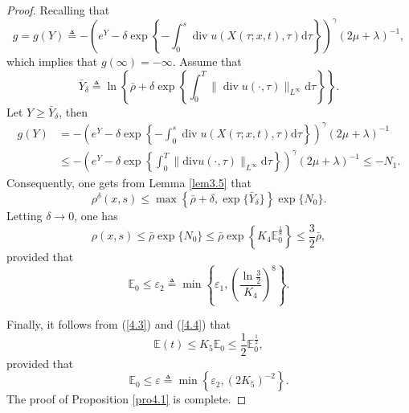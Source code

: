 \documentclass[10pt,a4paper]{amsart}
\DeclareMathOperator{\divv}{div}
\begin{document}
\begin{proof}
Recalling that
$$
g = g (Y) \triangleq - \left(e^{Y} - \delta \exp\left\{- \int^s_0 \divv u \left(X(\tau;x,t), \tau \right) \mathrm{d} \tau \right\} \right)^{\gamma} \left( 2 \mu + \lambda \right)^{-1},
$$
which implies that $g(\infty ) = - \infty $. Assume that
$$
\bar{Y}_{\delta} \triangleq \ln \left\{ \bar{\rho} + \delta \exp\left\{\int^T_0 \|\divv u(\cdot,\tau)\|_{L^{\infty }} \mathrm{d} \tau \right\} \right\}.
$$
Let $Y \geq \bar{Y}_{\delta}$, then
$$
\begin{aligned}
g(Y)
& = - \left(e^{Y} - \delta \exp\left\{- \int^s_0 \divv u \left(X(\tau;x,t), \tau \right) \mathrm{d} \tau \right\} \right)^{\gamma} \left( 2 \mu + \lambda \right)^{-1}\\
& \leq - \left(e^{Y} - \delta \exp\left\{\int^T_0 \|\mathrm{div} u (\cdot,\tau)\|_{L^{\infty }} \mathrm{d} \tau \right\} \right)^{\gamma} \left( 2 \mu + \lambda \right)^{-1} \leq - N_1.
\end{aligned}
$$
Consequently, one gets from Lemma \ref{lem3.5} that
$$
\rho^{\delta} (x, s) \leq \max\left\{ \bar{\rho} + \delta, \exp\{\bar{Y}_{\delta} \}\right\} \exp\{N_0\}.
$$
Letting $\delta \rightarrow 0$, one has
$$
\rho(x,s) \leq \bar{\rho} \exp\{N_0\} \leq \bar{\rho} \exp\left\{K_4 \mathbb{E}_0^{\frac{1}{8}}\right\} \leq \frac{3}{2} \bar{\rho},
$$
provided that
$$
\mathbb{E}_0 \leq \varepsilon_2 \triangleq \min \left\{\varepsilon_1,  \left(\frac{ \ln \frac{3}{2}}{K_4} \right)^8\right\}.
$$

Finally, it follows from (\ref{4.3}) and (\ref{4.4}) that
$$
\mathbb{E} (t) \leq K_5 \mathbb{E}_0 \leq \frac{1}{2} \mathbb{E}_0^{\frac{1}{2}},
$$
provided that
$$
\mathbb{E}_0 \leq \varepsilon \triangleq \min \left\{\varepsilon_2, (2 K_5)^{-2} \right\}.
$$
The proof of Proposition \ref{pro4.1} is complete.
\end{proof}
\end{document}
